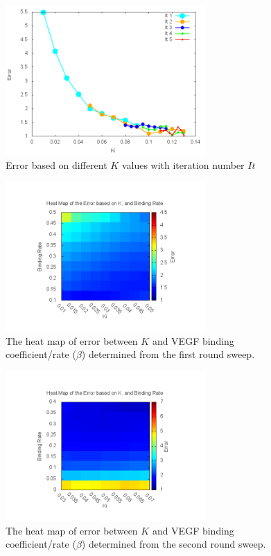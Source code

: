 
\begin{figure}[!t]
\centering
\includegraphics[width=3in]{./figures/Results/ki.png}

\caption{Error based on different $K$ values with iteration number $It$}
\label{Ki}
\end{figure}




\begin{figure}[!t]
\centering
\includegraphics[width=3in]{./figures/Results/KiB1.png}

\caption{The heat map of error between $K$ and VEGF binding coefficient/rate ($\beta$) determined from the first round sweep.}
\label{KiB1}
\end{figure}



\begin{figure}[!t]
\centering
\includegraphics[width=3in]{./figures/Results/KiB2.png}

\caption{The heat map of error between $K$ and VEGF binding coefficient/rate ($\beta$) determined from the second round sweep.}
\label{KiB2}
\end{figure}


